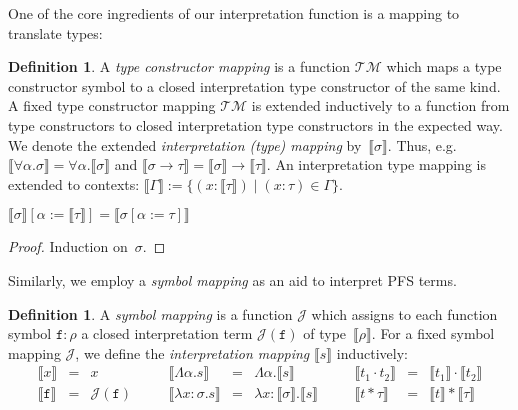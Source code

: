 \documentclass[a4paper,UKenglish,cleveref,autoref,numberwithinsect]{lipics-v2019}
\theoremstyle{definition}
\newtheorem{defn}[theorem]{Definition}
\newcommand{\arrtype}{\rightarrow}
\newcommand{\quant}[2]{\forall #1.#2}
\newcommand{\app}[2]{#1 \cdot #2}
\newcommand{\tapp}[2]{#1 * #2}
\newcommand{\abs}[2]{\lambda #1.#2}
\newcommand{\tabs}[2]{\Lambda #1.#2}
\newcommand{\typeinterpret}[1]{\llbracket #1 \rrbracket}
\newcommand{\interpret}[1]{\llbracket #1 \rrbracket}
\newcommand{\itp}[1]{\llbracket #1 \rrbracket}
\newcommand{\Typemap}{\mathcal{T\!M}}
\newcommand{\Termmap}{\mathcal{J}}
\begin{document}
One of the core ingredients of our interpretation function is a
mapping to translate types:

\begin{defn}
  A \emph{type constructor mapping} is a function $\Typemap$ which
  maps a type constructor symbol to a closed interpretation type
  constructor of the same kind. A fixed type constructor mapping
  $\Typemap$ is extended inductively to a function from type
  constructors to closed interpretation type constructors in the
  expected way. We denote the extended \emph{interpretation (type)
    mapping} by~$\typeinterpret{\sigma}$. Thus,
  e.g.~$\typeinterpret{\quant{\alpha}{\sigma}} =
  \quant{\alpha}{\typeinterpret{\sigma}}$ and $\typeinterpret{\sigma
    \arrtype \tau} = \typeinterpret{\sigma} \arrtype
  \typeinterpret{\tau}$. An interpretation type mapping is extended to
  contexts: \( \itp{\Gamma} := \{ (x : \typeinterpret{\tau}) \mid (x :
  \tau) \in \Gamma \}.  \)
\end{defn}

\begin{lemma}\label{lem:substitutioninterpret:types}
  $\typeinterpret{\sigma}[\alpha:=\typeinterpret{\tau}] =
  \typeinterpret{\sigma[\alpha:=\tau]}$
\end{lemma}

\begin{proof}
  Induction on~$\sigma$.
\end{proof}

Similarly, we employ a \emph{symbol mapping} as an aid to interpret
PFS terms.

\begin{defn}
  A \emph{symbol mapping} is a function $\Termmap$ which assigns to
  each function symbol $\mathtt{f} : \rho$ a closed interpretation
  term $\Termmap(\mathtt{f})$ of type~$\typeinterpret{\rho}$. For a
  fixed symbol mapping $\Termmap$, we define the \emph{interpretation
    mapping} $\interpret{s}$ inductively:
  \[
    \begin{array}{rclcrclcrcl}
      \interpret{x} & = & x &\quad&
      \interpret{\tabs{\alpha}{s}} & = & \tabs{\alpha}{\interpret{s}} &\quad&
      \interpret{\app{t_1}{t_2}} &=& \app{\interpret{t_1}}{\interpret{t_2}} \\
      \interpret{\mathtt{f}} &=& \Termmap(\mathtt{f}) & \quad &
      \interpret{\abs{x:\sigma}{s}} & = & \abs{x:\typeinterpret{\sigma}}{
                                          \interpret{s}} & \quad &
      \interpret{\tapp{t}{\tau}} &=& \tapp{\interpret{t}}{\typeinterpret{\tau}} \\
    \end{array}
  \]
\end{defn}
\end{document}
